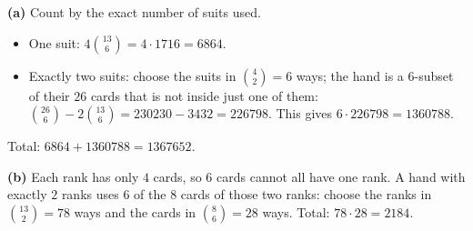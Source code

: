\textbf{(a)} Count by the exact number of suits used.
\begin{itemize}
\item One suit: $4\binom{13}{6}=4\cdot1716=6864$.
\item Exactly two suits: choose the suits in $\binom42=6$ ways; the hand is a $6$-subset of their $26$ cards that is not inside just one of them: $\binom{26}{6}-2\binom{13}{6}=230230-3432=226798$. This gives $6\cdot226798=1360788$.
\end{itemize}
Total: $6864+1360788=\boxed{1367652}$.

\textbf{(b)} Each rank has only $4$ cards, so $6$ cards cannot all have one rank. A hand with exactly $2$ ranks uses $6$ of the $8$ cards of those two ranks: choose the ranks in $\binom{13}{2}=78$ ways and the cards in $\binom86=28$ ways. Total: $78\cdot28=\boxed{2184}$.
